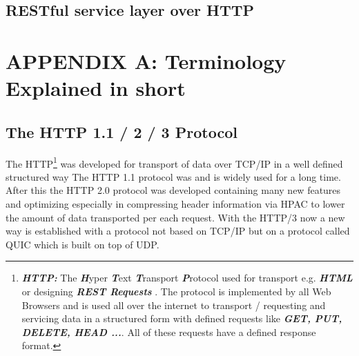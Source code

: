 \documentclass[10pt,a4paper,english]{article}
\newcommand{\abbrhighcol}[1]{\textbf{\textit{#1}}}
\begin{document}
\begin{multicols}{2}
\subsection{RESTful service layer over HTTP }
\begin{flushleft}
\end{flushleft}

\section{APPENDIX A: Terminology Explained in short}
\subsection{The HTTP 1.1 / 2 / 3 Protocol}   
\begin{flushleft}
The HTTP\footnote{\abbrhighcol{HTTP:}  The \abbrhighcol{H}yper \abbrhighcol{T}ext \abbrhighcol {T}ransport \abbrhighcol {P}rotocol used for transport  e.g. \abbrhighcol{HTML} or designing  \abbrhighcol{REST Requests} . The protocol is implemented by all Web Browsers and is used all over the internet to transport / requesting and servicing data in a structured form with defined requests like \abbrhighcol{GET, PUT, DELETE, HEAD ...}. All of these requests have a defined response format.} was developed for transport of data over TCP/IP in a well defined structured way  
The HTTP 1.1 protocol was and is widely used for a long time.
After this the HTTP 2.0 protocol was developed containing many new features and optimizing especially in compressing header information via HPAC to lower the amount of data transported per each request.
With the HTTP/3 now a new way is established with a protocol not based on TCP/IP but on a protocol called QUIC which is built on top of UDP.
\end{flushleft}

\end{multicols}
\end{document}

